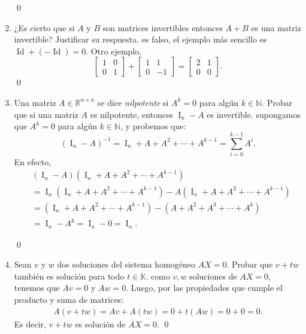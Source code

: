 \begin{enumerate}[topsep=6pt,itemsep=.4cm]
\qed



\item ¿Es cierto que si $A$ y $B$ son matrices invertibles entonces $A+B$ es una matriz invertible? Justificar su respuesta.
\rta es  falso, el ejemplo más sencillo es $\operatorname{Id} +(-\operatorname{Id}) =0$. Otro ejemplo, 
\begin{equation*}
    \begin{bmatrix}  1&0\\0&1 \end{bmatrix} + \begin{bmatrix}  1&1\\0&-1 \end{bmatrix} = \begin{bmatrix}  2&1\\0&0 \end{bmatrix}. 
\end{equation*}\qed



\item\label{nilpotene - id} Una matriz $A\in\mathbb{R}^{n\times n}$ se dice \emph{nilpotente} si $A^k=0$ para algún $k\in\mathbb{N}$.
Probar que si una matriz $A$ es nilpotente, entonces  $\operatorname{I}_n - A$  es invertible.
\rta supongamos que $A^k=0$ para algún $k\in\mathbb{N}$, y probemos que: $$(\operatorname{I}_n - A)^{-1} = \operatorname{I}_n + A + A^2 +\cdots + A^{k-1} = \sum_{i=0}^{k-1} A^{i}.$$
En efecto,
\begin{align*}
& (\operatorname{I}_n - A)(\operatorname{I}_n + A + A^2 +\cdots + A^{k-1})\\
&= \operatorname{I}_n (\operatorname{I}_n + A + A^2 +\cdots + A^{k-1}) - A (\operatorname{I}_n + A + A^2 +\cdots + A^{k-1})\\
&= (\operatorname{I}_n + A + A^2 +\cdots + A^{k-1}) - (A + A^2 + A^3 +\cdots + A^{k})\\
&= \operatorname{I}_n - A^{k} = \operatorname{I}_n - 0 = \operatorname{I}_n.
\end{align*}

\qed


\item\label{sol homog es subesp} Sean  $v$ y $w$ dos soluciones del sistema homogéneo $AX=0$. Probar que $v+tw$ también es solución para todo $t\in\mathbb{K}$.
\rta como $v,w$  soluciones de $AX=0$, tenemos que $Av=0$ y $Aw=0$.  Luego, por las propiedades que cumple el producto y suma de matrices:
\begin{eqnarray*}
    A(v + tw) = Av +A(tw) = 0 + t(Aw) = 0 + 0 = 0.
\end{eqnarray*}
Es decir, $v +tw$  es solución de $AX=0$.
\qed



\end{enumerate}
